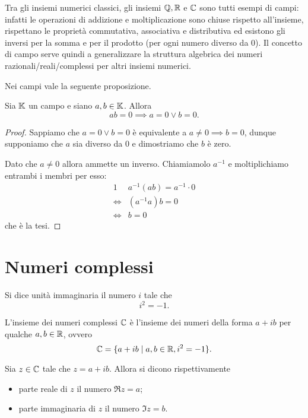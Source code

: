 Tra gli insiemi numerici classici, gli insiemi $\mathbb{Q}, \mathbb{R}$ e $\mathbb{C}$ sono tutti esempi di campi: infatti le operazioni di addizione e moltiplicazione sono chiuse rispetto all'insieme, rispettano le proprietà commutativa, associativa e distributiva ed esistono gli inversi per la somma e per il prodotto (per ogni numero diverso da $0$). Il concetto di campo serve quindi a generalizzare la struttura algebrica dei numeri razionali/reali/complessi per altri insiemi numerici.

Nei campi vale la seguente proposizione.
\begin{proposition}
     \label{annullamento_prodotto}
    Sia $\mathbb{K}$ un campo e siano $a, b \in \mathbb{K}$. Allora \[
        ab = 0 \implies a = 0 \lor b = 0.    
    \]
\end{proposition}
\begin{proof}
    Sappiamo che $a = 0 \lor b = 0$ è equivalente a $a \neq 0 \implies b = 0$, dunque supponiamo che $a$ sia diverso da $0$ e dimostriamo che $b$ è zero.

    Dato che $a \neq 0$ allora ammette un inverso. Chiamiamolo $a^{-1}$ e moltiplichiamo entrambi i membri per esso:
    \begin{alignat*}
        {1}
        &a^{-1}(ab) = a^{-1} \cdot 0\\
        \iff &(a^{-1}a)b = 0 \\
        \iff &b = 0
    \end{alignat*}
    che è la tesi.
\end{proof}

\section{Numeri complessi}

\begin{definition}
    Si dice unità immaginaria il numero $i$ tale che \[
        i^2 = -1.    
    \]
\end{definition}

\begin{definition}
    L'insieme dei numeri complessi $\mathbb{C}$ è l'insieme dei numeri della forma $a+ib$ per qualche $a, b \in \mathbb{R}$, ovvero \[
        \mathbb{C} = \{ a + ib \mid a, b \in \mathbb{R}, i^2 = -1\}.  
    \]
\end{definition}

\begin{definition}
    Sia $z \in \mathbb{C}$ tale che $z = a + ib$. Allora si dicono rispettivamente \begin{itemize}
        \item parte reale di $z$ il numero $\Re z = a$;
        \item parte immaginaria di $z$ il numero $\Im z = b$.
    \end{itemize}
\end{definition}

